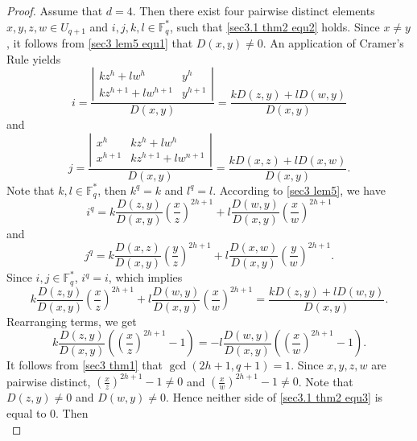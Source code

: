 \documentclass[10pt]{article}%
\begin{document}
\begin{proof}
		 Assume that $d=4$. Then there exist four pairwise distinct elements $x,y,z,w\in U_{q+1}$ and $i,j,k,l\in\mathbb{F}_q^\ast$, such that \cref{sec3.1 thm2 equ2} holds. Since $x\ne y$, it follows from \cref{sec3 lem5 equ1} that $D(x,y)\ne0$. An application of Cramer's Rule yields
		 \begin{equation*}
		 	i=\frac{\left|\begin{array}{ll}kz^{h}+lw^{h} & y^{h}\\kz^{h+1}+lw^{h+1}&y^{h+1}\end{array}\right|}{D(x,y)}=\frac{kD(z,y)+lD(w,y)}{D(x,y)}
		 \end{equation*}
		 and
		 \begin{equation*}
		 	j=\frac{\left|\begin{array}{ll}x^{h} &  kz^{h}+lw^{h}\\x^{h+1} & kz^{h+1}+lw^{n+1}\end{array}\right|}{D(x,y)}=\frac{kD(x,z)+lD(x,w)}{D(x,y)}.
		 \end{equation*}
		 Note that $k,l\in \mathbb{F}_q^\ast$, then $k^q=k$ and $l^q=l$. According to \cref{sec3 lem5}, we have
		 \begin{equation*}
		 	i^{q}=k\frac{D(z,y)}{D(x,y)}\left(\frac{x}{z}\right)^{2h+1}+l\frac{D(w,y)}{D(x,y)}\left(\frac{x}{w}\right)^{2h+1}
		 \end{equation*}
		 and 
		 \begin{equation*}
		 	j^{q}=k\frac{D(x,z)}{D(x,y)}\left(\frac{y}{z}\right)^{2h+1}+l\frac{D(x,w)}{D(x,y)}\left(\frac{y}{w}\right)^{2h+1}.
		 \end{equation*}
		 Since $i,j\in\mathbb{F}_q^\ast$, $i^q=i$, which implies
		 \begin{equation*}
		 	k\frac{D(z,y)}{D(x,y)}\left(\frac{x}{z}\right)^{2h+1}+l\frac{D(w,y)}{D(x,y)}\left(\frac{x}{w}\right)^{2h+1}=\frac{kD(z,y)+lD(w,y)}{D(x,y)}.
		 \end{equation*}
		 Rearranging terms, we get
		 \begin{equation}\label{sec3.1 thm2 equ3}
		 	k\frac{D(z,y)}{D(x,y)}\left(\left(\frac{x}{z}\right)^{2h+1}-1\right)=-l\frac{D(w,y)}{D(x,y)}\left(\left(\frac{x}{w}\right)^{2h+1}-1\right).
		 \end{equation}
		 It follows from \cref{sec3 thm1} that $\gcd(2h+1,q+1)=1$. Since $x,y,z,w$ are pairwise distinct, $\left(\frac{x}{z}\right)^{2h+1}-1\ne0$ and $\left(\frac{x}{w}\right)^{2h+1}-1\ne0$. Note that $D(z,y)\ne0$ and $D(w,y)\ne0$. Hence neither side of \cref{sec3.1 thm2 equ3} is equal to 0. Then
		 \begin{equation}\label{sec3.1 thm2 equ4}

\end{equation}
\end{proof}
\end{document}
